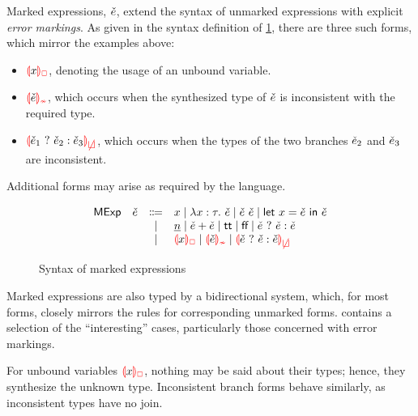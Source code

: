 Marked expressions, $\check{e}$, extend the syntax of unmarked expressions with explicit \emph{error
markings}. As given in the syntax definition of \cref{fig:calculus-syntax-mexp}, there are three
such forms, which mirror the examples above:
%
\begin{itemize}
  \item $\ECUnbound{x}$, denoting the usage of an unbound variable.

  \item $\ECInconType{\ECMV}$, which occurs when the synthesized type of $\check{e}$ is inconsistent
    with the required type.

  \item $\ECInconBr{\ECMV_1}{\ECMV_2}{\ECMV_3}$, which occurs when the types of the two branches
    $\check{e}_2$ and $\check{e}_3$ are inconsistent.
\end{itemize}
%
Additional forms may arise as required by the language.

\begin{figure}[htbp]
  \[\begin{array}{rrcl}
    \ECMName & \ECMV & \Coloneqq & x \mid \ECLam{x}{\TMV}{\ECMV} \mid \ECAp{\ECMV}{\ECMV} \mid \ECLet{x}{\ECMV}{\ECMV} \\
             &       & \mid         & \ECNumMV \mid \ECPlus{\ECMV}{\ECMV}
                       \mid           \ECTrue \mid \ECFalse \mid \ECIf{\ECMV}{\ECMV}{\ECMV} \\
             &       & \mid         & \ECUnbound{x} \mid \ECInconType{\ECMV} \mid \ECInconBr{\ECMV}{\ECMV}{\ECMV}
  \end{array}\]
  \caption{Syntax of marked expressions}
  \label{fig:calculus-syntax-mexp}
\end{figure}

Marked expressions are also typed by a bidirectional system, which, for most forms, closely mirrors
the rules for corresponding unmarked forms.  contains a selection of
the ``interesting'' cases, particularly those concerned with error markings.




For unbound variables $\ECUnbound{x}$, nothing may be said about their types; hence, they synthesize
the unknown type. Inconsistent branch forms behave similarly, as inconsistent types have no join.

